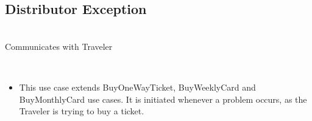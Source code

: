 \subsection{Distributor Exception}


 \\
Communicates with Traveler
\\

 \\
\begin{itemize}

\item This use case extends BuyOneWayTicket, BuyWeeklyCard and BuyMonthlyCard use cases. It is initiated whenever a problem occurs, as the Traveler is trying to buy a ticket.

\end{itemize}
